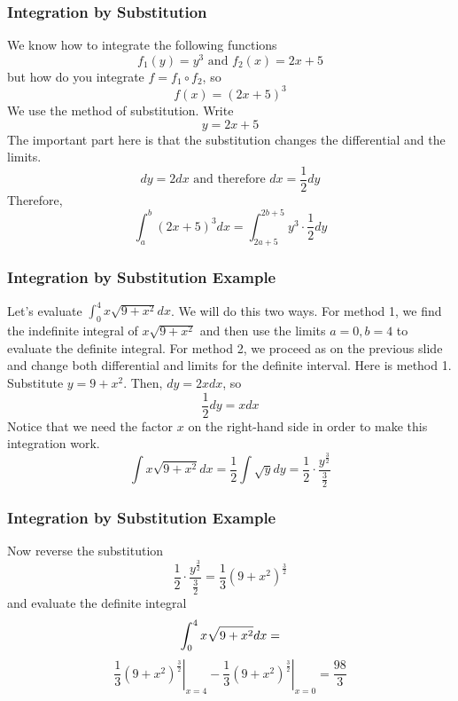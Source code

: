 \documentclass[xcolor=dvipsnames]{beamer}
\begin{document}
\begin{frame}
  \frametitle{Integration by Substitution}
We know how to integrate the following functions
\begin{equation}
  \label{eq:deixugha}
  f_{1}(y)=y^{3}\mbox{ and }f_{2}(x)=2x+5
\end{equation}
but how do you integrate $f=f_{1}\circ{}f_{2}$, so
\begin{equation}
  \label{eq:eetusiil}
  f(x)=(2x+5)^{3}
\end{equation}
We use the method of \alert{substitution}. Write 
\begin{equation}
  \label{eq:ohshaoxe}
  y=2x+5
\end{equation}
The important part here is that the substitution changes the
differential and the limits.
\begin{equation}
  \label{eq:ushooxiu}
  dy=2dx\mbox{ and therefore }dx=\frac{1}{2}dy
\end{equation}
Therefore,
\begin{equation}
  \label{eq:olaihaxi}
  \int_{a}^{b}(2x+5)^{3}dx=\int_{2a+5}^{2b+5}y^{3}\cdot{}\frac{1}{2}dy
\end{equation}
\end{frame}

\begin{frame}
  \frametitle{Integration by Substitution Example}
Let's evaluate $\int_{0}^{4}x\sqrt{9+x^{2}}dx$. We will do this two
ways. For method 1, we find the indefinite integral of
$x\sqrt{9+x^{2}}$ and then use the limits $a=0,b=4$ to evaluate the
definite integral. For method 2, we proceed as on the previous slide
and change both differential and limits for the definite interval.
Here is method 1. Substitute $y=9+x^{2}$. Then, $dy=2xdx$, so 
\begin{equation}
  \label{eq:iachuejo}
  \frac{1}{2}dy=xdx
\end{equation}
Notice that we need the factor $x$ on the right-hand side in order to
make this integration work.
\begin{equation}
  \label{eq:diacheiv}
  \int{}x\sqrt{9+x^{2}}dx=\frac{1}{2}\int{}\sqrt{y}dy=\frac{1}{2}\cdot\frac{y^{\frac{3}{2}}}{\frac{3}{2}}
\end{equation}
\end{frame}

\begin{frame}
  \frametitle{Integration by Substitution Example}
Now reverse the substitution
\begin{equation}
  \label{eq:shaixeen}
\frac{1}{2}\cdot\frac{y^{\frac{3}{2}}}{\frac{3}{2}}=\frac{1}{3}(9+x^{2})^{\frac{3}{2}}
\end{equation}
and evaluate the definite integral
\begin{equation}
  \label{eq:eileevar}
\int_{0}^{4}x\sqrt{9+x^{2}}dx=\notag
\end{equation}
\begin{equation}
  \label{eq:lumuewah}
\left.\frac{1}{3}(9+x^{2})^{\frac{3}{2}}\right\vert_{x=4}-\left.\frac{1}{3}(9+x^{2})^{\frac{3}{2}}\right\vert_{x=0}=\frac{98}{3}
\end{equation}
\end{frame}
\end{document}
